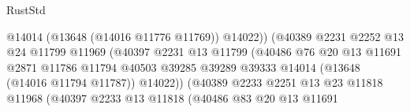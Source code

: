 \begin{lexlean}{RustStd}
\begin{coremodule}
                                                  @14014
                                                  (@13648 (@14016 @11776 @11769))
                                                  @14022))
                                              (@40389
                                                @2231
                                                @2252
                                                @13
                                                @24
                                                @11799
                                                @11969
                                                (@40397
                                                  @2231
                                                  @13
                                                  @11799
                                                  (@40486
                                                    @76
                                                    @20
                                                    @13
                                                    @11691
                                                    @2871
                                                    @11786
                                                    @11794
                                                    @40503
                                                    @39285
                                                    @39289
                                                    @39333
                                                    @14014
                                                    (@13648 (@14016 @11794 @11787))
                                                    @14022))
                                                (@40389
                                                  @2233
                                                  @2251
                                                  @13
                                                  @23
                                                  @11818
                                                  @11968
                                                  (@40397
                                                    @2233
                                                    @13
                                                    @11818
                                                    (@40486
                                                      @83
                                                      @20
                                                      @13
                                                      @11691

\end{coremodule}
\end{lexlean}
